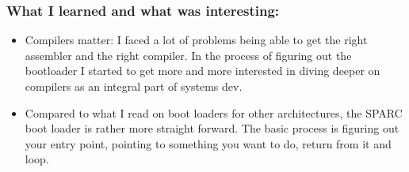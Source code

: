 \documentclass{beamer}
\begin{document}
\begin{frame}
    \frametitle{What I learned and what was interesting:}
    \begin{itemize}
        \item Compilers matter: I faced a lot of problems being able to get the right assembler and the right compiler. In the process of figuring out the bootloader I started to get more and more interested in diving deeper on compilers as an integral part of systems dev.
        \item Compared to what I read on boot loaders for other architectures, the SPARC boot loader is rather more straight forward. The basic process is figuring out your entry point, pointing to something you want to do, return from it and loop.
    \end{itemize}
\end{frame}
\end{document}
